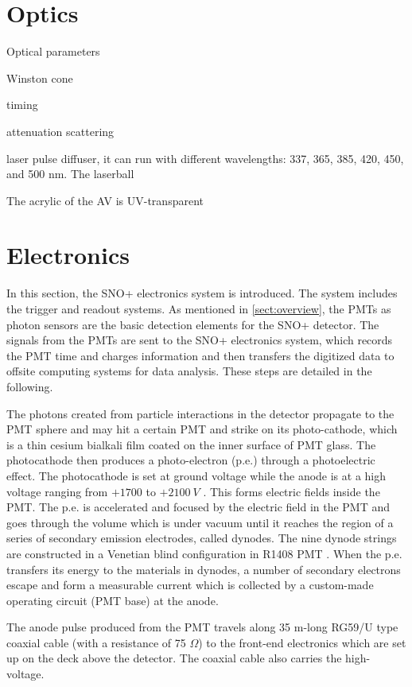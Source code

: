 \section{Optics}\label{optics}

Optical parameters

Winston cone

timing

attenuation
scattering

laser pulse diffuser, it can run with different wavelengths: 337, 365, 385, 420, 450, and 500 nm.
The laserball 

The acrylic of the AV is UV-transparent


\section{Electronics}
In this section, the SNO+ electronics system is introduced. The system includes the trigger and readout systems. As mentioned in \ref{sect:overview}, the PMTs as photon sensors are the basic detection elements for the SNO+ detector. The signals from the PMTs are sent to the SNO+ electronics system, which records the PMT time and charges information and then transfers the digitized data to offsite computing systems for data analysis. These steps are detailed in the following.

The photons created from particle interactions in the detector propagate to the PMT sphere and may hit a certain PMT and strike on its photo-cathode, which is a thin cesium bialkali film coated on the inner surface of PMT glass. The photocathode then produces a photo-electron (p.e.) through a photoelectric effect. The photocathode is set at ground voltage while the anode is at a high voltage ranging from $+1700$ to $+2100~V$ \cite{boger2000sudbury,dunger2018topological}. This forms electric fields inside the PMT. The p.e. is accelerated and focused by the electric field in the PMT and goes through the volume which is under vacuum until it reaches the region of a series of secondary emission electrodes, called dynodes. The nine dynode strings are constructed in a Venetian blind configuration in R1408 PMT \cite{boger2000sudbury,leo2012techniques}. When the p.e. transfers its energy to the materials in dynodes, a number of secondary electrons escape and form a measurable current which is collected by a custom-made operating circuit (PMT base) at the anode\cite{hamamatsu2018photomultiplier}.

The anode pulse produced from the PMT travels along 35 m-long RG59/U type coaxial cable (with a resistance of 75 $\Omega$) to the front-end electronics which are set up on the deck above the detector. The coaxial cable also carries the high-voltage\cite{boger2000sudbury}. 

